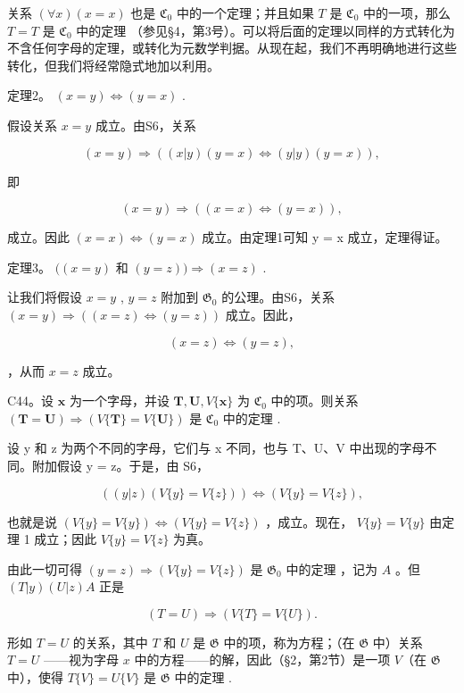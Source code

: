 关系 \((\forall x)(x = x)\) 也是 \(\mathfrak{C}_0\) 中的一个定理；并且如果 \(T\) 是 \(\mathfrak{C}_0\) 中的一项，那么 \(T = T\) 是 \(\mathfrak{C}_0\) 中的定理 （参见§4，第3号）。可以将后面的定理以同样的方式转化为不含任何字母的定理，或转化为元数学判据。从现在起，我们不再明确地进行这些转化，但我们将经常隐式地加以利用。

定理2。 \((x = y) \Longleftrightarrow (y = x)\) .

假设关系 \(x = y\) 成立。由S6，关系

\[
(x = y) \Longrightarrow ((x | y) (y = x) \Longleftrightarrow (y | y) (y = x)),
\]

即

\[
(x = y) \Longrightarrow ((x = x) \Longleftrightarrow (y = x)),
\]

成立。因此 \((x = x) \Longleftrightarrow (y = x)\) 成立。由定理1可知 y = x 成立，定理得证。

定理3。 \(((x = y)\) 和 \((y = z))\Longrightarrow (x = z)\) .

让我们将假设 \(x = y\) , \(y = z\) 附加到 \(\mathfrak{G}_0\) 的公理。由S6，关系 \((x = y) \Longrightarrow ((x = z) \Longleftrightarrow (y = z))\) 成立。因此，

\[
(x = z) \Longleftrightarrow (y = z),
\]

，从而 \(x = z\) 成立。

C44。设 \(\pmb{x}\) 为一个字母，并设 \(\pmb{T}, \pmb{U}, V\{\pmb{x}\}\) 为 \(\mathfrak{C}_0\) 中的项。则关系 \((\pmb{T} = \pmb{U}) \Longrightarrow (V\{\pmb{T}\} = V\{\pmb{U}\})\) 是 \(\mathfrak{C}_0\) 中的定理 .

设 y 和 z 为两个不同的字母，它们与 x 不同，也与 T、U、V 中出现的字母不同。附加假设 y = z。于是，由 S6，

\[
((y | z) (V \{y \} = V \{z \})) \Longleftrightarrow (V \{y \} = V \{z \}),
\]

也就是说 \((V\{y\} = V\{y\}) \Longleftrightarrow (V\{y\} = V\{z\})\) ，成立。现在， \(V\{y\} = V\{y\}\) 由定理 1 成立；因此 \(V\{y\} = V\{z\}\) 为真。

由此一切可得 \((y = z) \Longrightarrow (V\{y\} = V\{z\})\) 是 \(\mathfrak{G}_0\) 中的定理 ，记为 \(A\) 。但 \((T|y)(U|z)A\) 正是

\[
(T = U) \Longrightarrow (V \{T \} = V \{U \}).
\]

形如 \(T = U\) 的关系，其中 \(T\) 和 \(U\) 是 \(\mathfrak{G}\) 中的项，称为方程；（在 \(\mathfrak{G}\) 中）关系 \(T = U\) ——视为字母 \(x\) 中的方程——的解，因此（§2，第2节）是一项 \(V\)（在 \(\mathfrak{G}\) 中），使得 \(T\{V\} = U\{V\}\) 是 \(\mathfrak{G}\) 中的定理 .

